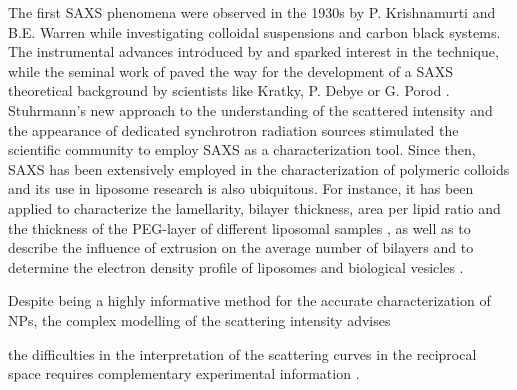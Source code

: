 The first SAXS phenomena were observed in the 1930s by P. Krishnamurti and B.E. Warren \citep{krishnamurti_studies_1930,krishnamurti_studies_1930-1, warren_xray_1934} while investigating colloidal suspensions and carbon black systems. The instrumental advances introduced by \cite{kratky_berechnung_1938} and \cite{guinier_dispositif_1937} sparked interest in the technique, while the seminal work of \cite{guinier_diffraction_1939} paved the way for the development of a SAXS theoretical background by scientists like Kratky, P. Debye or G. Porod \citep{kratky_bestimmung_1943,debye_scattering_1949,kratky_diffuse_1949,guinier_study_1950,guinier_small-angle_1955}. Stuhrmann's new approach to the understanding of the scattered intensity \citep{stuhrmann_elimination_1965} and the appearance of dedicated synchrotron radiation sources stimulated the scientific community to employ SAXS as a characterization tool. Since then, SAXS has been extensively employed in the characterization of polymeric colloids \citep{dingenouts_analysis_1999,chu_small-angle_2001,ballauff_analysis_2011} and its use in liposome research is also ubiquitous. For instance, it has been applied to characterize the lamellarity, bilayer thickness, area per lipid ratio \citep{pabst_applications_2010,bouwstra_small_1993,brzustowicz_x-ray_2005} and the thickness of the PEG-layer of different liposomal samples \citep{varga_closer_2010,varga_characterization_2012}, as well as to describe the influence of extrusion on the average number of bilayers \citep{jousma_characterization_1987} and to determine the electron density profile of liposomes \citep{bouwstra_small_1993,brzustowicz_x-ray_2005,hirai_determination_2003} and biological vesicles \citep{castorph_structure_2010}.



Despite being a highly informative method for the accurate characterization of NPs, the complex modelling of the scattering intensity advises


the difficulties in the interpretation of the scattering curves in the reciprocal space requires complementary experimental information \citep{mykhaylyk_structural_2012}. 





